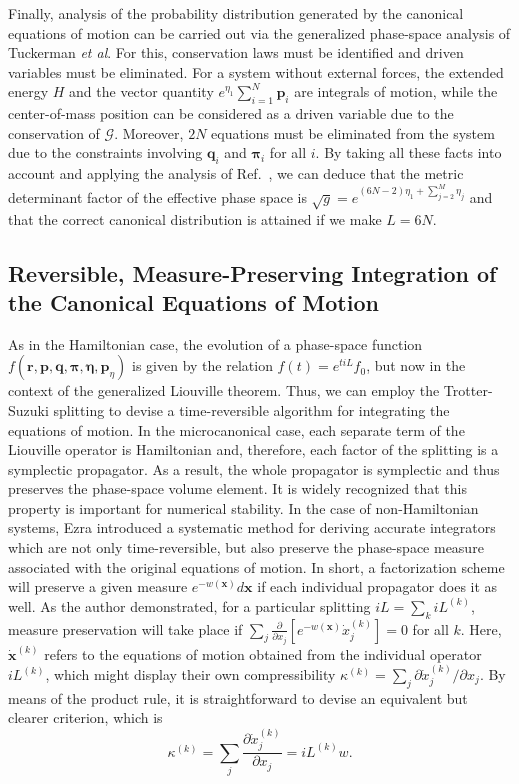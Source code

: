 \documentclass[aip,jcp,reprint,amsmath,amssymb]{revtex4-1}
\newcommand{\vt}[1]{\boldsymbol{\mathbf{#1}}}           %
\newcommand{\diff}[2]{\dfrac{\partial #1}{\partial #2}} %
\begin{document}
Finally, analysis of the probability distribution generated by the canonical equations of motion can be carried out via the generalized phase-space analysis of Tuckerman \textit{et al}.\cite{Tuckerman2001} For this, conservation laws must be identified and driven variables must be eliminated. For a system without external forces, the extended energy $H$ and the vector quantity $e^{\eta_1}\sum_{i=1}^N {\vt p}_i$ are integrals of motion, while the center-of-mass position can be considered as a driven variable due to the conservation of $\boldsymbol{\mathcal G}$.\cite{Tuckerman2001} Moreover, $2N$ equations must be eliminated from the system due to the constraints involving $\vt q_i$ and $\vt \pi_i$ for all $i$. By taking all these facts into account and applying the analysis of Ref.~, we can deduce that the metric determinant factor of the effective phase space is $\sqrt{g} = e^{(6N-2) \eta_1 + \sum_{j=2}^M \eta_j}$ and that the correct canonical distribution is attained if we make $L = 6N$.

\subsection{Reversible, Measure-Preserving Integration of the Canonical Equations of Motion}

As in the Hamiltonian case, the evolution of a phase-space function $f(\vt r, \vt p, \vt q, \vt \pi, \vt \eta,{\vt p}_\eta)$ is given by the relation $f(t) = e^{t i\!L}f_0$, but now in the context of the generalized Liouville theorem.\cite{Tuckerman_1999, Tuckerman2001} Thus, we can employ the Trotter-Suzuki splitting to devise a time-reversible algorithm for integrating the equations of motion. In the microcanonical case, each separate term of the Liouville operator is Hamiltonian and, therefore, each factor of the splitting is a symplectic propagator. As a result, the whole propagator is symplectic and thus preserves the phase-space volume element. It is widely recognized that this property is important for numerical stability.\cite{Skeel1997} In the case of non-Hamiltonian systems, Ezra\cite{Ezra2006} introduced a systematic method for deriving accurate integrators which are not only time-reversible, but also preserve the phase-space measure associated with the original equations of motion. In short, a factorization scheme will preserve a given measure $e^{-w(\vt x)}d\vt x$ if each individual propagator does it as well. As the author demonstrated,\cite{Ezra2006} for a particular splitting $i\!L = \sum_k i\!L^{(k)}$, measure preservation will take place if $\sum_j \tfrac{\partial}{\partial x_j} [e^{-w(\vt x)}\dot{x}_j^{(k)}] = 0$ for all $k$. Here, $\dot{\vt x}^{(k)}$ refers to the equations of motion obtained from the individual operator $i\!L^{(k)}$, which might display their own compressibility $\kappa^{(k)} = \sum_j \partial \dot{x}_j^{(k)}/\partial x_j$. By means of the product rule, it is straightforward to devise an equivalent but clearer criterion, which is
\begin{equation}
\label{eq:split_kappa_w}
\kappa^{(k)} = \sum_j \diff{\dot{x}_j^{(k)}}{x_j} = i\!L^{(k)} w.
\end{equation}
\end{document}
